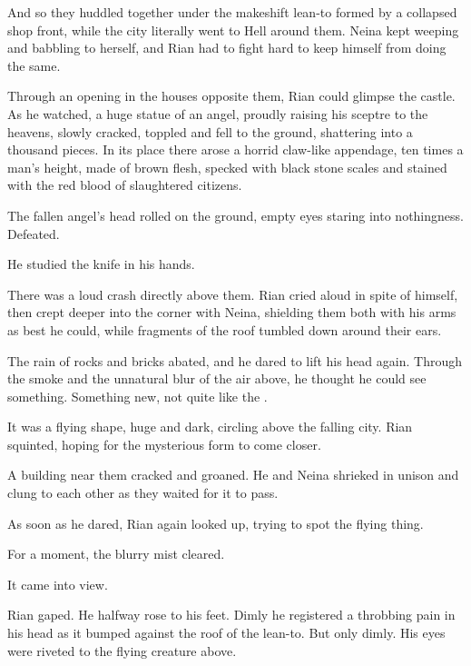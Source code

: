 And so they huddled together under the makeshift lean-to formed by a collapsed shop front, while the city literally went to Hell around them. 
Neina kept weeping and babbling to herself, and Rian had to fight hard to keep himself from doing the same. 

Through an opening in the houses opposite them, Rian could glimpse the castle. 
As he watched, a huge statue of an angel, proudly raising his sceptre to the heavens, slowly cracked, toppled and fell to the ground, shattering into a thousand pieces. In its place there arose a horrid claw-like appendage, ten times a man's height, made of brown flesh, specked with black stone scales and stained with the red blood of slaughtered citizens. 

The fallen angel's head rolled on the ground, empty eyes staring into nothingness. Defeated. 


He studied the knife in his hands. 

There was a loud crash directly above them. 
Rian cried aloud in spite of himself, then crept deeper into the corner with Neina, shielding them both with his arms as best he could, while fragments of the roof tumbled down around their ears. 


The rain of rocks and bricks abated, and he dared to lift his head again. 
Through the smoke and the unnatural blur of the air above, he thought he could see something. 
Something new, not quite like the \daemons. 

It was a flying shape, huge and dark, circling above the falling city. 
Rian squinted, hoping for the mysterious form to come closer. 

A building near them cracked and groaned. 
He and Neina shrieked in unison and clung to each other as they waited for it to pass. 

As soon as he dared, Rian again looked up, trying to spot the flying thing. 

For a moment, the blurry mist cleared. 

It came into view. 

Rian gaped. 
He halfway rose to his feet. 
Dimly he registered a throbbing pain in his head as it bumped against the roof of the lean-to. 
But only dimly. 
His eyes were riveted to the flying creature above.

